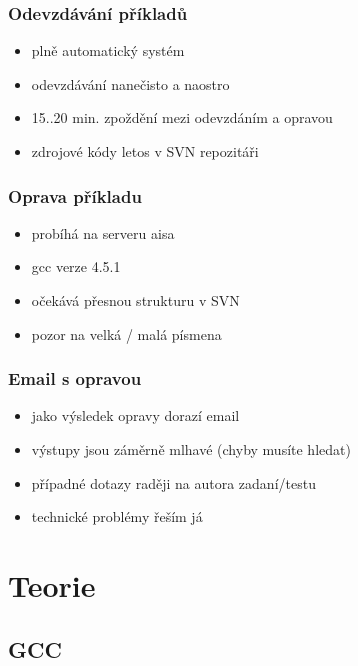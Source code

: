 \begin{frame}
	\frametitle{Odevzdávání příkladů}
	\begin{itemize}
		\item{plně automatický systém}
		\item{odevzdávání nanečisto a naostro}
		\item{15..20 min. zpoždění mezi odevzdáním a opravou}
		\item{zdrojové kódy letos v SVN repozitáři}
	\end{itemize}
\end{frame}

\begin{frame}
	\frametitle{Oprava příkladu}
	\begin{itemize}
		\item{probíhá na serveru aisa}
		\item{gcc verze 4.5.1}
		\item{očekává přesnou strukturu v SVN}
		\item{pozor na velká / malá písmena}
	\end{itemize}
\end{frame}

\begin{frame}
	\frametitle{Email s opravou}
	\begin{itemize}
		\item{jako výsledek opravy dorazí email}
		\item{výstupy jsou záměrně mlhavé (chyby musíte hledat)}
		\item{případné dotazy raději na autora zadaní/testu}
		\item{technické problémy řeším já}
	\end{itemize}
\end{frame}

\section{Teorie}
\subsection{GCC}

